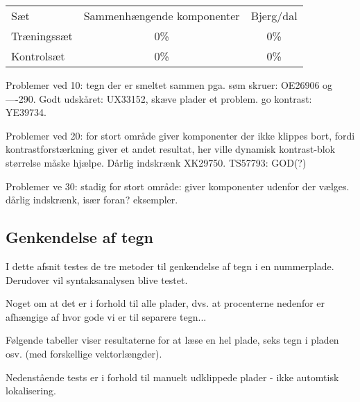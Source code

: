 \begin{tabular}{|l|c|c|}\hline
\rowcolor[gray]{0.9} \multicolumn{3}{|>{\columncolor[gray]{0.9}}c|}{\textbf{Automatisk lokalisering}} \\ \hline
Sæt & Sammenhængende komponenter & Bjerg/dal \\\hline
Træningssæt & 0\% & 0\% \\\hline
Kontrolsæt & 0\% & 0\% \\\hline
\end{tabular}


Problemer ved 10: tegn der er smeltet sammen pga. søm skruer: OE26906 og ----290. Godt udskåret: UX33152, skæve plader et problem. go kontrast: YE39734.

Problemer ved 20: for stort område giver komponenter der ikke klippes bort, fordi kontrastforstærkning giver et andet resultat, her ville dynamisk kontrast-blok størrelse måske hjælpe. Dårlig indskrænk XK29750. TS57793: GOD(?) 

Problemer ve 30: stadig for stort område: giver komponenter udenfor der vælges. dårlig indskrænk, især foran? eksempler.





\subsection{Genkendelse af tegn}
I dette afsnit testes de tre metoder til genkendelse af tegn i en nummerplade. Derudover vil syntaksanalysen blive testet.

Noget om at det er i forhold til alle plader, dvs. at procenterne nedenfor er afhængige af hvor gode vi er til separere tegn...


Følgende tabeller viser resultaterne for at læse en hel plade, seks tegn i pladen osv. (med forskellige vektorlængder).

Nedenstående tests er i forhold til manuelt udklippede plader - ikke automtisk lokalisering.

